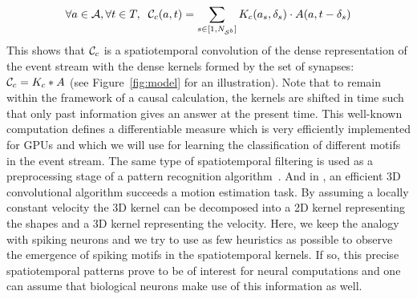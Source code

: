 \documentclass[default]{sn-jnl}%
\theoremstyle{thmstyleone}%
\theoremstyle{thmstyletwo}%
\theoremstyle{thmstylethree}%
\begin{document}
%
\begin{equation}\label{eq:conv}
\forall a \in \mathcal{A}, \forall t \in T, \; \;
\mathcal{C}_c(a,t)
= \sum_{s  \in [1, N_{\mathcal{S}^b}]} K_c(a_s, \delta_s) \cdot A(a, t-\delta_s)
\end{equation}
%
This shows that $\mathcal{C}_c$ is a spatiotemporal convolution of the dense representation of the event stream with the dense kernels formed by the set of synapses:  $\mathcal{C}_c = K_c \ast A$ (see Figure~\ref{fig:model} for an illustration). Note that to remain within the framework of a causal calculation, the kernels are shifted in time such that only past information gives an answer at the present time.
This well-known computation defines a differentiable measure which is very efficiently implemented for GPUs and which we will use for learning the classification of different motifs in the event stream.
%
The same type of spatiotemporal filtering is used as a preprocessing stage of a pattern recognition algorithm~\cite{ghosh_spatiotemporal_2019}. And in \cite{sekikawa_constant_2018}, an efficient 3D convolutional algorithm succeeds a motion estimation task. By assuming a locally constant velocity the 3D kernel can be decomposed into a 2D kernel representing the shapes and a 3D kernel representing the velocity. Here, we keep the analogy with spiking neurons and we try to use as few heuristics as possible to observe the emergence of spiking motifs in the spatiotemporal kernels. If so, this precise spatiotemporal patterns prove to be of interest for neural computations and one can assume that biological neurons make use of this information as well. 
\end{document}
